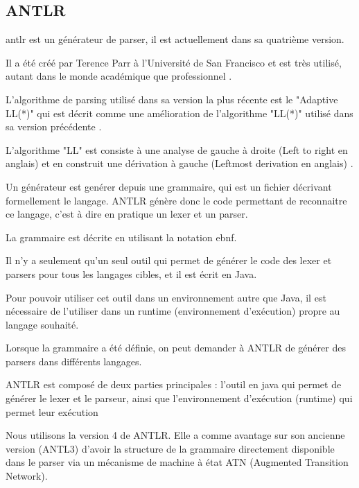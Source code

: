 \documentclass[
    iict, %
    il, %
]{heig-tb}
\begin{document}
\subsection{ANTLR}

\Gls{antlr} est un générateur de parser, il est actuellement dans sa quatrième version.

Il a été créé par Terence Parr à l'Université de San Francisco et est très utilisé, autant dans le monde académique que professionnel \cite{antlr}.

L'algorithme de parsing utilisé dans sa version la plus récente est le "Adaptive LL(*)" qui est décrit comme une amélioration de l'algorithme
"LL(*)" utilisé dans sa version précédente \cite{adaptive-ll}.

L'algorithme "LL" est  consiste à une analyse de gauche à droite (Left to right en anglais) et en construit une dérivation à gauche (Leftmost derivation en anglais) \cite{ll}.

Un générateur est genérer depuis une grammaire, qui est un fichier décrivant formellement le langage.
ANTLR génère donc le code permettant de reconnaitre ce langage, c'est à dire en pratique un lexer et un parser. %

La grammaire est décrite en utilisant la notation \Gls{ebnf}.

Il n'y a seulement qu'un seul outil qui permet de générer le code des lexer et parsers pour tous les langages cibles, et il est écrit en Java.

Pour pouvoir utiliser cet outil dans un environnement autre que Java, il est nécessaire de l'utiliser dans un runtime (environnement d'exécution) propre au langage souhaité.

Lorsque la grammaire a été définie, on peut demander à ANTLR de générer des parsers dans différents langages.

ANTLR est composé de deux parties principales : l'outil en java qui permet de générer le lexer et le parseur, ainsi que l'environnement d'exécution (runtime) qui permet leur exécution


Nous utilisons la version 4 de ANTLR. Elle a comme avantage sur son ancienne version (ANTL3) d'avoir la structure de la grammaire directement disponible dans le parser via
un mécanisme de machine à état ATN (Augmented Transition Network).
\end{document}
